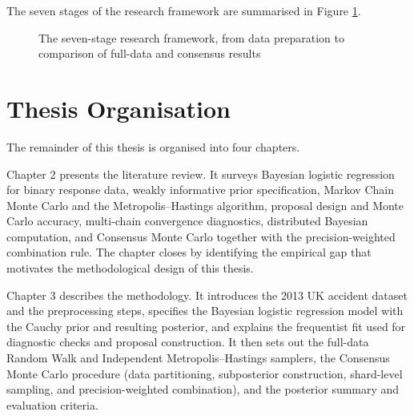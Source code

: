 The seven stages of the research framework are summarised in Figure \ref{fig:research_framework}.

\begin{figure}[htbp]
\centering
{}
\caption{The seven-stage research framework, from data preparation to comparison of full-data and consensus results}
\label{fig:research_framework}
\end{figure}

\section{Thesis Organisation}

The remainder of this thesis is organised into four chapters.

Chapter 2 presents the literature review. It surveys Bayesian logistic regression for binary response data, weakly informative prior specification, Markov Chain Monte Carlo and the Metropolis--Hastings algorithm, proposal design and Monte Carlo accuracy, multi-chain convergence diagnostics, distributed Bayesian computation, and Consensus Monte Carlo together with the precision-weighted combination rule. The chapter closes by identifying the empirical gap that motivates the methodological design of this thesis.

Chapter 3 describes the methodology. It introduces the 2013 UK accident dataset and the preprocessing steps, specifies the Bayesian logistic regression model with the Cauchy prior and resulting posterior, and explains the frequentist fit used for diagnostic checks and proposal construction. It then sets out the full-data Random Walk and Independent Metropolis--Hastings samplers, the Consensus Monte Carlo procedure (data partitioning, subposterior construction, shard-level sampling, and precision-weighted combination), and the posterior summary and evaluation criteria.

